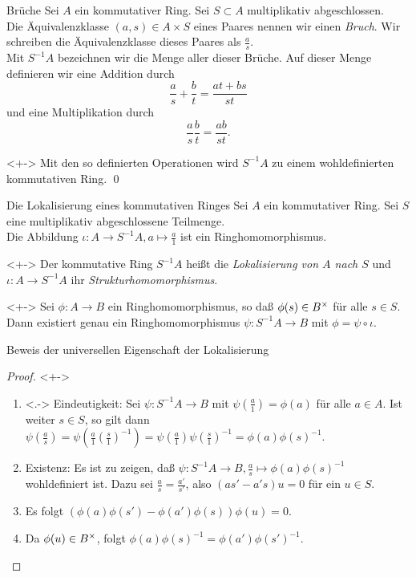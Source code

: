 \begin{frame}{Brüche}
	Sei \(A\) ein kommutativer Ring. Sei \(S \subset A\) multiplikativ abgeschlossen.
	\\Die Äquivalenzklasse
	\((a, s) \in A \times S\) eines Paares nennen wir einen \emph{Bruch}. Wir schreiben die Äquivalenzklasse
	dieses Paares als \(\frac a s\).
	\\
	Mit \(S^{-1} A\) bezeichnen wir die Menge aller dieser Brüche. Auf dieser Menge definieren wir eine Addition
	durch
	\[
		\frac a s + \frac b t = \frac{at + bs}{st}
	\]
	und eine Multiplikation durch
	\[
		\frac a s \frac b t = \frac{ab}{st}.
	\]
	\begin{proposition}<+->
		Mit den so definierten Operationen wird \(S^{-1} A\) zu einem wohldefinierten kommutativen Ring.
		\qed
	\end{proposition}
\end{frame}

\begin{frame}{Die Lokalisierung eines kommutativen Ringes}
	Sei \(A\) ein kommutativer Ring. Sei \(S\) eine multiplikativ abgeschlossene Teilmenge.
	\\
	Die Abbildung \(\iota\colon A \to S^{-1} A, a \mapsto \frac a 1\) ist ein Ringhomomorphismus.
	\begin{definition}<+->
		Der kommutative Ring \(S^{-1} A\) heißt die \emph{Lokalisierung von \(A\) nach \(S\)} und
		\(\iota\colon A \to S^{-1} A\) ihr \emph{Strukturhomomorphismus}.
	\end{definition}
	\begin{proposition}<+->
		Sei \(\phi\colon A \to B\) ein Ringhomomorphismus, so daß \(\phi(s) \in B^\times\) für alle \(s \in S\).
		Dann existiert genau ein Ringhomomorphismus \(\psi\colon S^{-1} A \to B\) mit \(\phi = \psi \circ \iota\).
	\end{proposition}
\end{frame}

\begin{frame}{Beweis der universellen Eigenschaft der Lokalisierung}
	\begin{proof}<+->
		\begin{enumerate}[<+->]
		\item<.->
			Eindeutigkeit: Sei \(\psi\colon S^{-1} A \to B\) mit \(\psi(\frac a 1) = \phi(a)\) für alle \(a \in A\). 
			Ist weiter \(s \in S\), so gilt dann 
			\(\psi(\frac a s) = \psi(\frac a 1 (\frac s 1)^{-1}) = \psi(\frac a 1) \psi(\frac s 1)^{-1}
			= \phi(a) \phi(s)^{-1}\).
		\item
			Existenz: Es ist zu zeigen, daß \(\psi\colon S^{-1} A \to B, \frac a s \mapsto \phi(a) \phi(s)^{-1}\) wohldefiniert
			ist. Dazu sei \(\frac a s = \frac{a'}{s'}\), also \((a s' - a' s) u = 0\) für ein \(u \in S\).
		\item
			Es folgt \((\phi(a) \phi(s') - \phi(a') \phi(s)) \phi(u) = 0\).
		\item
			Da \(\phi(u) \in B^\times\), folgt \(\phi(a) \phi(s)^{-1} = \phi(a') \phi(s')^{-1}\).
			\qedhere
		\end{enumerate}
	\end{proof}
\end{frame}

